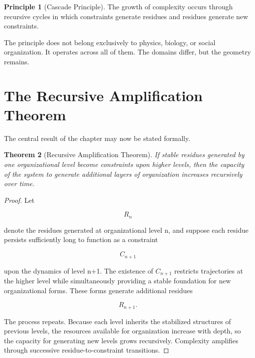 \documentclass[11pt,oneside]{book}
\theoremstyle{plain}
\newtheorem{theorem}{Theorem}[chapter]
\theoremstyle{definition}
\newtheorem{principle}[theorem]{Principle}
\theoremstyle{remark}
\begin{document}
\begin{principle}[Cascade Principle]
The growth of complexity occurs through recursive cycles in which constraints generate residues and residues generate new constraints.
\end{principle}

The principle does not belong exclusively to physics, biology, or social organization. It operates across all of them. The domains differ, but the geometry remains.

\section{The Recursive Amplification Theorem}

The central result of the chapter may now be stated formally.

\begin{theorem}[Recursive Amplification Theorem]
If stable residues generated by one organizational level become constraints upon higher levels, then the capacity of the system to generate additional layers of organization increases recursively over time.
\end{theorem}

\begin{proof}
Let

\begin{equation}
R_n
\end{equation}

denote the residues generated at organizational level n, and suppose each residue persists sufficiently long to function as a constraint

\begin{equation}
C_{n+1}
\end{equation}

upon the dynamics of level n+1. The existence of \(C_{n+1}\) restricts trajectories at the higher level while simultaneously providing a stable foundation for new organizational forms. These forms generate additional residues

\begin{equation}
R_{n+1}.
\end{equation}

The process repeats. Because each level inherits the stabilized structures of previous levels, the resources available for organization increase with depth, so the capacity for generating new levels grows recursively. Complexity amplifies through successive residue-to-constraint transitions.
\end{proof}
\end{document}
